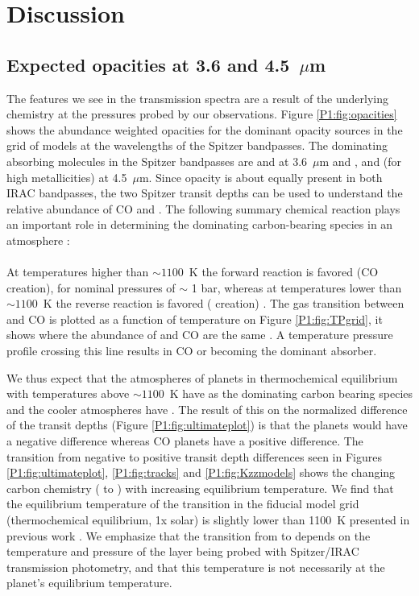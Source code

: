 \section{Discussion}
\label{P1:sec:Discussion}

\subsection{Expected opacities at 3.6 and 4.5~$\mu$m}
\label{P1:subsec:Chemistry}

The features we see in the transmission spectra are a result of the underlying chemistry at the pressures probed by our observations. Figure \ref{P1:fig:opacities} shows the abundance weighted opacities for the dominant opacity sources in the grid of models at the wavelengths of the Spitzer bandpasses. The dominating absorbing molecules in the Spitzer bandpasses are  and  at 3.6~$\mu$m and ,  and  (for high metallicities) at 4.5~$\mu$m. Since  opacity is about equally present in both IRAC bandpasses, the two Spitzer transit depths can be used to understand the relative abundance of CO and . The following summary chemical reaction plays an important role in determining the dominating carbon-bearing species in an atmosphere \citep[e.g.,][]{Visscher2010, Moses2011, Visscher2011, Ebbing2016}:
\\
\\

At temperatures higher than $\sim1100$~K the forward reaction is favored (CO creation), for nominal pressures of $\sim$ 1 bar, whereas at temperatures lower than $\sim1100$~K the reverse reaction is favored ( creation) \citep[e.g.][]{Madhusudhan2012, Molliere2015, Molaverdikhani2019}. The gas transition between  and CO is plotted as a function of temperature on Figure \ref{P1:fig:TPgrid}, it shows where the abundance of  and CO are the same \citet{Visscher2012}. A temperature pressure profile crossing this line results in CO or  becoming the dominant absorber.

We thus expect that the atmospheres of planets in thermochemical equilibrium with temperatures above $\sim1100$~K have  as the dominating carbon bearing species and the cooler atmospheres have . The result of this on the normalized difference of the transit depths (Figure \ref{P1:fig:ultimateplot}) is that the  planets would have a negative difference whereas CO planets have a positive difference. The transition from negative to positive transit depth differences seen in Figures \ref{P1:fig:ultimateplot}, \ref{P1:fig:tracks} and \ref{P1:fig:Kzzmodels} shows the changing carbon chemistry ( to ) with increasing equilibrium temperature. We find that the equilibrium temperature of the transition in the fiducial model grid (thermochemical equilibrium, 1x solar) is slightly lower than 1100~K presented in previous work \citep[e.g.,][]{Madhusudhan2012}. We emphasize that the transition from  to  depends on the temperature and pressure of the layer being probed with Spitzer/IRAC transmission photometry, and that this temperature is not necessarily at the planet's equilibrium temperature.

